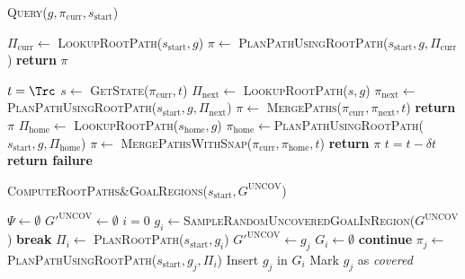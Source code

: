 {\begin{algorithm}
\caption{\textsc{Query}($g, \pi_{\textrm{curr}},s_{\textrm{start}}$)}\label{alg:3}  
\begin{algorithmic}[1]
    \State $\Pi_{\textrm{curr}} \leftarrow$ \textsc{LookupRootPath}($s_{\textrm{start}},g$)
        \State $\pi \leftarrow$ \textsc{PlanPathUsingRootPath}($s_{\textrm{start}},g,\Pi_{\textrm{curr}}$)
        \State \textbf{return} $\pi$
    \EndIf

\State $t = \Trc$
    \State $s \leftarrow$ \textsc{GetState}($\pi_{\textrm{curr}}, t$)
    \State $\Pi_{\textrm{next}} \leftarrow$  \textsc{LookupRootPath}($s,g$)
        \State $\pi_{\textrm{next}} \leftarrow$\textsc{PlanPathUsingRootPath}($s_{\textrm{start}},g,\Pi_{\textrm{next}}$)
        \State $\pi \leftarrow$ \textsc{MergePaths}($\pi_{\textrm{curr}},\pi_{\textrm{next}},t$)
        \State \textbf{return} $\pi$
    \EndIf
    {\color{blue}
    \State $\Pi_{\textrm{home}} \leftarrow$ \textsc{LookupRootPath}($s_{\textrm{home}},g$)
            \State $\pi_{\textrm{home}} \leftarrow$\textsc{PlanPathUsingRootPath}($s_{\textrm{start}},g,\Pi_{\textrm{home}}$)
            \State $\pi \leftarrow$ \textsc{MergePathsWithSnap}($\pi_{\textrm{curr}},\pi_{\textrm{home}}, t$)
            \State \textbf{return} $\pi$
        \EndIf
    \EndIf
    }
    \State $t = t - \delta t$
\EndWhile
\State \textbf{return failure}
\end{algorithmic}
\end{algorithm}

\begin{algorithm}
\caption{\textsc{ComputeRootPaths$\&$GoalRegions}($s_{\textrm{start}}, G^{\textrm{UNCOV}}$)}\label{alg:4}
\begin{algorithmic}[1]
\State $\Psi \leftarrow \emptyset$   
\State $G'^{\textrm{UNCOV}} \leftarrow \emptyset$
\State $i = 0$
    
    \State $g_i \leftarrow$\textsc{SampleRandomUncoveredGoalInRegion}($G^{\textrm{UNCOV}}$)
        \State \textbf{break}
    \EndIf
    \State $\Pi_i \leftarrow$ \textsc{PlanRootPath}($s_{\textrm{start}}, g_i$)
      
        \State $G'^{\textrm{UNCOV}} \leftarrow g_j$
    \EndIf
    \State $G_i \leftarrow \emptyset$
            \State \textbf{continue}
        \EndIf
        \State $\pi_j \leftarrow$\textsc{PlanPathUsingRootPath}($s_{\textrm{start}},g_j,\Pi_i$)
         
            \State Insert $g_j$ in $G_i$
            \State Mark $g_j$ as \emph{covered}
        \EndIf
        

\end{algorithmic}
\end{algorithm}}
